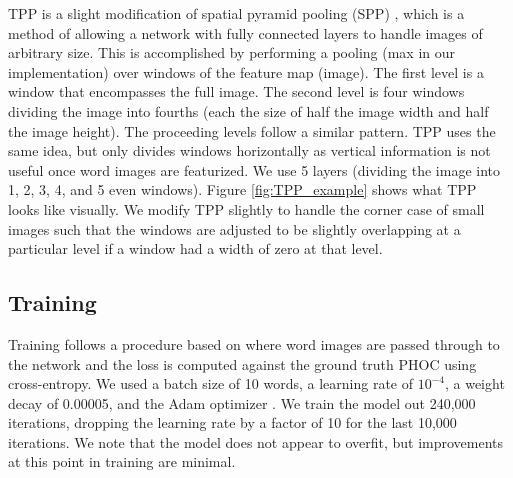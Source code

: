 \documentclass[ms,electronic,twosidetoc,letterpaper,chaptercenter,parttop,lof,lot]{byumsphd}
\begin{document}
TPP is a slight modification of spatial pyramid pooling (SPP) \cite{SPP}, which is a method of allowing a network with fully connected layers to handle images of arbitrary size. This is accomplished by performing a pooling (max in our implementation) over windows of the feature map (image). The first level is a window that encompasses the full image. The second level is four windows dividing the image into fourths (each the size of half the image width and half the image height). The proceeding levels follow a similar pattern. TPP uses the same idea, but only divides windows horizontally as vertical information is not useful once word images are featurized. We use 5 layers (dividing the image into 1, 2, 3, 4, and 5 even windows). Figure \ref{fig:TPP_example} shows what TPP looks like visually. %
We modify TPP slightly to handle the corner case of small images such that the windows are adjusted to be slightly overlapping at a particular level if a window had a width of zero at that level.




\subsection{Training}

Training follows a procedure based on \cite{sudholt2017} where word images are passed through to the network and the loss is computed against the ground truth PHOC using cross-entropy. We used a batch size of 10 words, a learning rate of $10^{-4}$, a weight decay of 0.00005, and the Adam optimizer \cite{adam}.
We train the model out 240,000 iterations, dropping the learning rate by a factor of 10 for the last 10,000 iterations. We note that the model does not appear to overfit, but improvements at this point in training are minimal.
\end{document}

